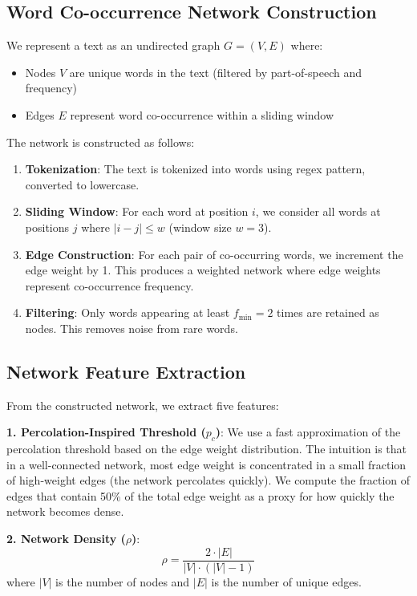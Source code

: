 \documentclass[11pt,letterpaper]{article}
\begin{document}
\subsection{Word Co-occurrence Network Construction}

We represent a text as an undirected graph $G = (V, E)$ where:
\begin{itemize}
\item Nodes $V$ are unique words in the text (filtered by part-of-speech and frequency)
\item Edges $E$ represent word co-occurrence within a sliding window
\end{itemize}

The network is constructed as follows:

\begin{enumerate}
\item \textbf{Tokenization}: The text is tokenized into words using regex pattern, converted to lowercase.
\item \textbf{Sliding Window}: For each word at position $i$, we consider all words at positions $j$ where $|i - j| \leq w$ (window size $w = 3$).
\item \textbf{Edge Construction}: For each pair of co-occurring words, we increment the edge weight by 1. This produces a weighted network where edge weights represent co-occurrence frequency.
\item \textbf{Filtering}: Only words appearing at least $f_{\min} = 2$ times are retained as nodes. This removes noise from rare words.
\end{enumerate}

\subsection{Network Feature Extraction}

From the constructed network, we extract five features:

\textbf{1. Percolation-Inspired Threshold ($p_c$)}: We use a fast approximation of the percolation threshold based on the edge weight distribution. The intuition is that in a well-connected network, most edge weight is concentrated in a small fraction of high-weight edges (the network percolates quickly). We compute the fraction of edges that contain 50\% of the total edge weight as a proxy for how quickly the network becomes dense.

\textbf{2. Network Density ($\rho$)}: 
\[\rho = \frac{2 \cdot |E|}{|V| \cdot (|V| - 1)}\]
where $|V|$ is the number of nodes and $|E|$ is the number of unique edges.
\end{document}
